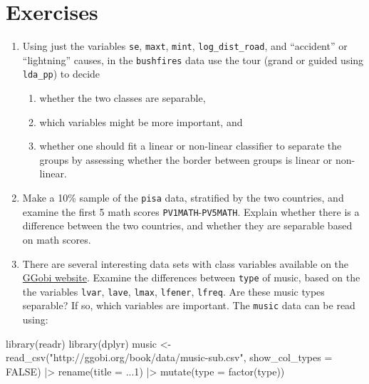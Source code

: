 \documentclass[
  letterpaper,
]{krantz}
\newenvironment{Shaded}{\begin{snugshade}}{\end{snugshade}}
\newcommand{\AttributeTok}[1]{\textcolor[rgb]{0.40,0.45,0.13}{#1}}
\newcommand{\ConstantTok}[1]{\textcolor[rgb]{0.56,0.35,0.01}{#1}}
\newcommand{\FunctionTok}[1]{\textcolor[rgb]{0.28,0.35,0.67}{#1}}
\newcommand{\NormalTok}[1]{\textcolor[rgb]{0.00,0.23,0.31}{#1}}
\newcommand{\OtherTok}[1]{\textcolor[rgb]{0.00,0.23,0.31}{#1}}
\newcommand{\SpecialCharTok}[1]{\textcolor[rgb]{0.37,0.37,0.37}{#1}}
\newcommand{\StringTok}[1]{\textcolor[rgb]{0.13,0.47,0.30}{#1}}
\providecommand{\tightlist}{%
  \setlength{\itemsep}{0pt}\setlength{\parskip}{0pt}}
\begin{document}
\section*{Exercises}\label{exercises-12}


\begin{enumerate}
\def\labelenumi{\arabic{enumi}.}
\item
  Using just the variables \texttt{se}, \texttt{maxt}, \texttt{mint},
  \texttt{log\_dist\_road}, and ``accident'' or ``lightning'' causes, in
  the \texttt{bushfires} data use the tour (grand or guided using
  \texttt{lda\_pp}) to decide

  \begin{enumerate}
  \def\labelenumii{\alph{enumii}.}
  \tightlist
  \item
    whether the two classes are separable,
  \item
    which variables might be more important, and
  \item
    whether one should fit a linear or non-linear classifier to separate
    the groups by assessing whether the border between groups is linear
    or non-linear.
  \end{enumerate}
\item
  Make a 10\% sample of the \texttt{pisa} data, stratified by the two
  countries, and examine the first 5 math scores
  \texttt{PV1MATH}-\texttt{PV5MATH}. Explain whether there is a
  difference between the two countries, and whether they are separable
  based on math scores.
\item
  There are several interesting data sets with class variables available
  on the \href{http://ggobi.org/book/index.html}{GGobi website}. Examine
  the differences between \texttt{type} of music, based on the the
  variables \texttt{lvar}, \texttt{lave}, \texttt{lmax},
  \texttt{lfener}, \texttt{lfreq}. Are these music types separable? If
  so, which variables are important. The \texttt{music} data can be read
  using: 
\end{enumerate}

\begin{Shaded}
\begin{Highlighting}[]
\FunctionTok{library}\NormalTok{(readr)}
\FunctionTok{library}\NormalTok{(dplyr)}
\NormalTok{music }\OtherTok{\textless{}{-}} \FunctionTok{read\_csv}\NormalTok{(}\StringTok{"http://ggobi.org/book/data/music{-}sub.csv"}\NormalTok{,}
                  \AttributeTok{show\_col\_types =} \ConstantTok{FALSE}\NormalTok{) }\SpecialCharTok{|\textgreater{}}
  \FunctionTok{rename}\NormalTok{(}\AttributeTok{title =} \StringTok{\textasciigrave{}}\AttributeTok{...1}\StringTok{\textasciigrave{}}\NormalTok{) }\SpecialCharTok{|\textgreater{}}
  \FunctionTok{mutate}\NormalTok{(}\AttributeTok{type =} \FunctionTok{factor}\NormalTok{(type))}
\end{Highlighting}
\end{Shaded}
\end{document}
